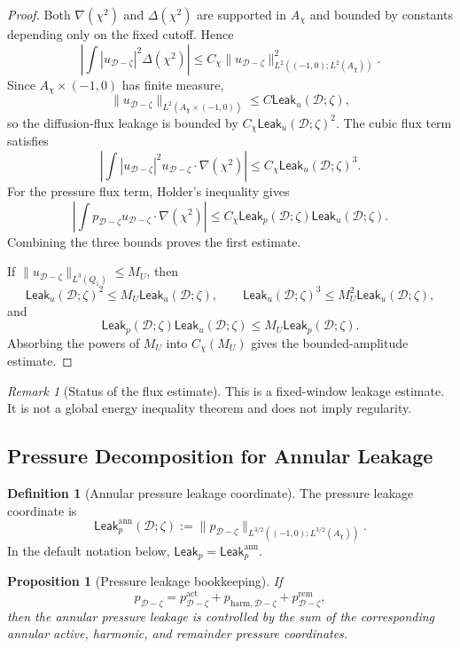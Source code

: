 \documentclass[11pt]{article}
\numberwithin{equation}{section}
\newtheorem{proposition}[proposition]{Proposition}
\theoremstyle{definition}
\newtheorem{definition}[definition]{Definition}
\theoremstyle{remark}
\newtheorem{remark}[remark]{Remark}
\newcommand{\harm}{\mathrm{harm}}
\newcommand{\Leak}{\mathsf{Leak}}
\newcommand{\calD}{\mathcal D}
\newcommand{\Qone}{Q_1}
\begin{document}
\begin{proof}
Both \(\nabla(\chi^2)\) and \(\Delta(\chi^2)\) are supported in \(A_\chi\) and
bounded by constants depending only on the fixed cutoff.  Hence
\[
    \left|
        \int |u_{\calD-\zeta}|^2\Delta(\chi^2)
    \right|
    \le
    C_\chi
    \|u_{\calD-\zeta}\|_{L^2((-1,0);L^2(A_\chi))}^2.
\]
Since \(A_\chi\times(-1,0)\) has finite measure,
\[
    \|u_{\calD-\zeta}\|_{L^2(A_\chi\times(-1,0))}
    \le
    C\Leak_u(\calD;\zeta),
\]
so the diffusion-flux leakage is bounded by \(C_\chi\Leak_u(\calD;\zeta)^2\).
The cubic flux term satisfies
\[
    \left|
        \int |u_{\calD-\zeta}|^2
        u_{\calD-\zeta}\cdot\nabla(\chi^2)
    \right|
    \le
    C_\chi\Leak_u(\calD;\zeta)^3.
\]
For the pressure flux term, Holder's inequality gives
\[
    \left|
        \int p_{\calD-\zeta}
        u_{\calD-\zeta}\cdot\nabla(\chi^2)
    \right|
    \le
    C_\chi
    \Leak_p(\calD;\zeta)\Leak_u(\calD;\zeta).
\]
Combining the three bounds proves the first estimate.

If \(\|u_{\calD-\zeta}\|_{L^3(\Qone)}\le M_U\), then
\[
    \Leak_u(\calD;\zeta)^2\le M_U\Leak_u(\calD;\zeta),
    \qquad
    \Leak_u(\calD;\zeta)^3\le M_U^2\Leak_u(\calD;\zeta),
\]
and
\[
    \Leak_p(\calD;\zeta)\Leak_u(\calD;\zeta)
    \le
    M_U\Leak_p(\calD;\zeta).
\]
Absorbing the powers of \(M_U\) into \(C_\chi(M_U)\) gives the
bounded-amplitude estimate.
\end{proof}

\begin{remark}[Status of the flux estimate]
This is a fixed-window leakage estimate.  It is not a global energy inequality
theorem and does not imply regularity.
\end{remark}

\subsection{Pressure Decomposition for Annular Leakage}
\label{loc:sec:pressure-leakage}

\begin{definition}[Annular pressure leakage coordinate]
\label{loc:def:annular-pressure-leakage}
The pressure leakage coordinate is
\[
    \Leak_p^{\mathrm{ann}}(\calD;\zeta)
    :=
    \|p_{\calD-\zeta}\|_{L^{3/2}((-1,0);L^{3/2}(A_\chi))}.
\]
In the default notation below, \(\Leak_p=\Leak_p^{\mathrm{ann}}\).
\end{definition}

\begin{proposition}[Pressure leakage bookkeeping]
\label{loc:prop:pressure-leakage-bookkeeping}
If
\[
    p_{\calD-\zeta}
    =
    p^{\mathrm{act}}_{\calD-\zeta}
    +
    p_{\harm,\calD-\zeta}
    +
    p^{\mathrm{rem}}_{\calD-\zeta},
\]
then the annular pressure leakage is controlled by the sum of the corresponding
annular active, harmonic, and remainder pressure coordinates.
\end{proposition}
\end{document}
